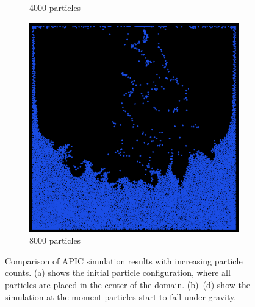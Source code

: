 \begin{figure}[h]
\begin{subfigure}[b]{0.2\textwidth}
        \caption{4000 particles}
    \end{subfigure}
    \hspace{1em}
    \begin{subfigure}[b]{0.2\textwidth}
        \includegraphics[width=\textwidth]{figures/apic8000.png}
        \caption{8000 particles}
    \end{subfigure}
    \caption{Comparison of APIC simulation results with increasing particle counts. 
    (a) shows the initial particle configuration, where all particles are placed in the center of the domain. 
    (b)–(d) show the simulation at the moment particles start to fall under gravity.}
    \label{fig:apic_comparison}
\end{figure}